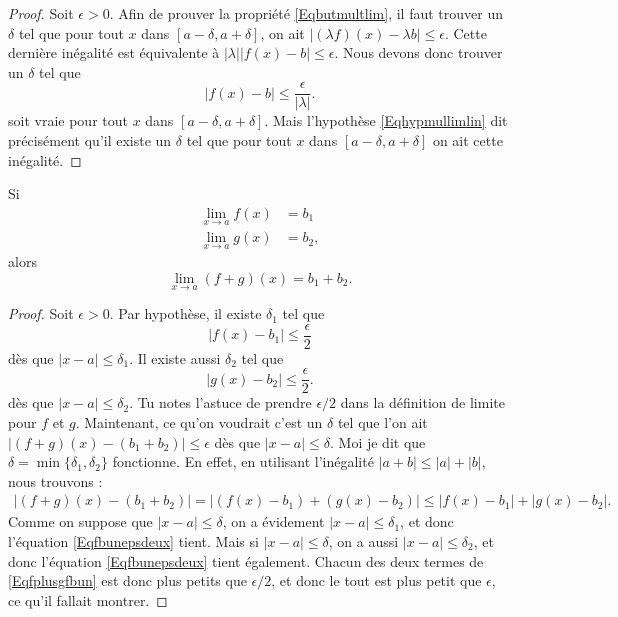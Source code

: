 \begin{proof}
Soit $\epsilon>0$. Afin de prouver la propriété \eqref{Eqbutmultlim}, il faut trouver un $\delta$ tel que pour tout $x$ dans $[a-\delta,a+\delta]$, on ait $| (\lambda f)(x)- \lambda b |\leq\epsilon$. Cette dernière inégalité est équivalente à $|\lambda|| f(x)-b |\leq\epsilon$. Nous devons donc trouver un $\delta$ tel que 
\begin{equation} 
| f(x)-b |\leq\frac{ \epsilon }{ | \lambda | }.
\end{equation}
soit vraie pour tout $x$ dans $[a-\delta,a+\delta]$. Mais l'hypothèse \eqref{Eqhypmullimlin} dit précisément qu'il existe un $\delta$ tel que pour tout $x$ dans $[a-\delta,a+\delta]$ on ait cette inégalité. 
\end{proof}

\begin{theorem}     \label{ThoLimLin}
    Si
    \begin{subequations}
    \begin{align}
        \lim_{x\to a}f(x)&=b_1\\
        \lim_{x\to a}g(x)&=b_2,
    \end{align}
    \end{subequations}
    alors
    \begin{equation}
        \lim_{x\to a}(f+g)(x)=b_1+b_2.
    \end{equation}
\end{theorem}

\begin{proof}
    Soit $\epsilon>0$. Par hypothèse, il existe $\delta_1$ tel que
    \begin{equation}    \label{Eqfbunepsdeux}
      | f(x)-b_1 |\leq \frac{ \epsilon }{ 2 }
    \end{equation}
    dès que $| x-a |\leq\delta_1$. Il existe aussi $\delta_2$ tel que 
    \begin{equation}    \label{Eqgbdeuxepsdeux}
      | g(x)-b_2 |\leq \frac{ \epsilon }{ 2 }.
    \end{equation}
    dès que $| x-a |\leq \delta_2$. Tu notes l'astuce de prendre $\epsilon/2$ dans la définition de limite pour $f$ et $g$. Maintenant, ce qu'on voudrait c'est un $\delta$ tel que l'on ait $| (f+g)(x)-(b_1+b_2) |\leq \epsilon$ dès que $| x-a |\leq \delta$. Moi je dit que $\delta=\min\{ \delta_1,\delta_2 \}$ fonctionne. En effet, en utilisant l'inégalité $| a+b |\leq | a |+| b |$, nous trouvons :
    \begin{align}
    | (f+g)(x)-(b_1+b_2) |=| (f(x)-b_1)+(g(x)-b_2) |
            \leq | f(x)-b_1 |+| g(x)-b_2 |.     \label{Eqfplusgfbun}
    \end{align}
    Comme on suppose que $| x-a |\leq\delta$, on a évidement $| x-a |\leq\delta_1$, et donc l'équation \eqref{Eqfbunepsdeux} tient. Mais si $| x-a |\leq\delta$, on a aussi $| x-a |\leq\delta_2$, et donc l'équation  \eqref{Eqfbunepsdeux} tient également. Chacun des deux termes de \eqref{Eqfplusgfbun} est donc plus petits que $\epsilon/2$, et donc le tout est plus petit que $\epsilon$, ce qu'il fallait montrer.

\end{proof}


